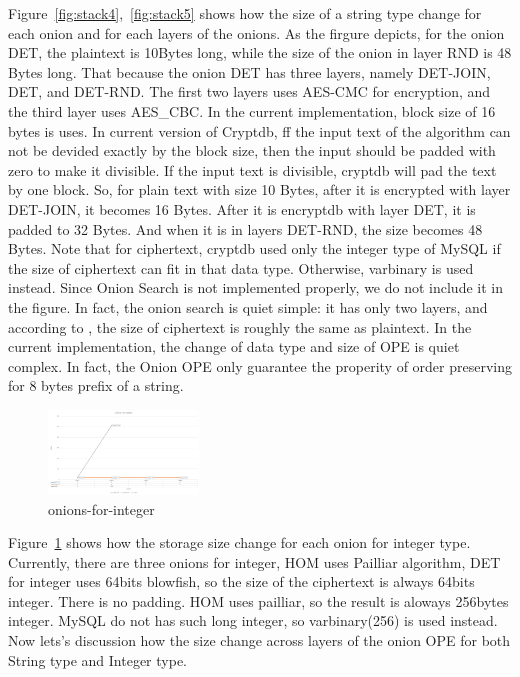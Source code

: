 Figure~\ref{fig:stack4},~\ref{fig:stack5} shows how the size of a string type change for each onion and for each layers of the onions. As the firgure depicts, for the onion DET, the plaintext is 10Bytes long, while the size of the onion in layer RND is 48 Bytes long. That because the onion DET has three layers, namely DET-JOIN, DET, and DET-RND. The first two layers uses AES-CMC for encryption, and the third layer uses AES\_CBC. In the current implementation, block size of 16 bytes is uses. In current version of Cryptdb,  ff the input text of the algorithm can not be devided exactly by the block size, then the input should be padded with zero to make it divisible. If the input text is divisible, cryptdb will pad the text by one block. So, for plain text with size 10 Bytes, after it is encrypted with layer DET-JOIN, it becomes 16 Bytes. After it is encryptdb with layer DET, it is padded to 32 Bytes. And when it is in layers DET-RND, the size becomes 48 Bytes. Note that for ciphertext, cryptdb used only the integer type of MySQL if the size of ciphertext can fit in that data type. Otherwise, varbinary is used instead. Since Onion Search is not implemented properly, we do not include it in the figure. In fact, the onion search is quiet simple: it has only two layers, and according to \citep{song2000practical}, the size of ciphertext is roughly the same as plaintext. In the current implementation, the change of data type and size of OPE is quiet complex. In fact, the Onion OPE only guarantee the properity of order preserving for 8 bytes prefix of a string.




\begin{figure}[tb]
\centering
\includegraphics[width=4cm]{images/onions-for-integer.png}
\caption{onions-for-integer}
\label{fig:stack6}
\end{figure}


Figure~\ref{fig:stack6} shows how the storage size change for each onion for integer type. Currently, there are three onions for integer, HOM uses Pailliar algorithm, DET for integer uses 64bits blowfish, so the size of the ciphertext is always 64bits integer. There is no padding. HOM uses pailliar, so the result is aloways 256bytes integer. MySQL do not has such long integer, so varbinary(256) is used instead. Now lets's discussion how the size change across layers of the onion OPE for both String type and Integer type. 



